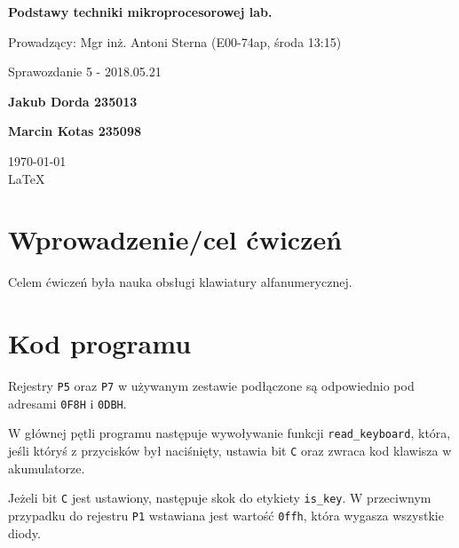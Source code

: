 \documentclass[12pt,a4paper]{article}
\begin{document}
	
	\begin{titlepage}
		
		\centering
		{\huge\bfseries Podstawy techniki mikroprocesorowej lab.\par}
		
		\vspace{0.5cm}
		Prowadzący: Mgr inż. Antoni Sterna (E00-74ap, środa 13:15) \\
	
		\vspace{1.1cm}
		{\Large Sprawozdanie 5 - 2018.05.21\par}
		\vfill
		
		{\large\bfseries Jakub Dorda 235013\par}
		{\large\bfseries Marcin Kotas 235098\par}
		
		\vspace{1cm}
		\today \\ \LaTeX
		
		\restoregeometry
	\end{titlepage}


	\section{Wprowadzenie/cel ćwiczeń}
		Celem ćwiczeń była nauka obsługi klawiatury alfanumerycznej.
		
	\section{Kod programu}
		Rejestry \verb|P5| oraz \verb|P7| w używanym zestawie podłączone są odpowiednio pod adresami \verb|0F8H| i \verb|0DBH|.
		
		\begin{minipage}{.5\textwidth}
			
		\end{minipage}%
		\begin{minipage}{.5\textwidth}
			W głównej pętli programu następuje wywoływanie funkcji \verb|read_keyboard|,
			która, jeśli któryś z przycisków był naciśnięty, ustawia bit \verb|C| oraz zwraca kod klawisza w akumulatorze.
			
			Jeżeli bit \verb|C| jest ustawiony, następuje skok do etykiety \verb|is_key|.
			W przeciwnym przypadku do rejestru \verb|P1| wstawiana jest wartość \verb|0ffh|, która wygasza wszystkie diody.
		\end{minipage}
		
\end{document}
